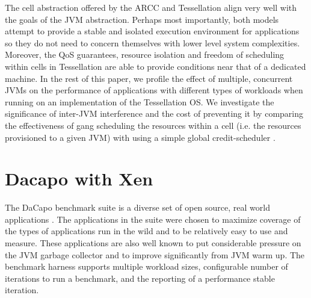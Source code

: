 \documentclass{sig-alternate}
\begin{document}
The cell abstraction offered by the ARCC and Tessellation align very well with the goals of the JVM abstraction. Perhaps most importantly, both models attempt to provide a stable and isolated execution environment for applications so they do not need to concern themselves with lower level system complexities. Moreover, the QoS guarantees, resource isolation and freedom of scheduling within cells in Tessellation are able to provide conditions near that of a dedicated machine. In the rest of this paper, we profile the effect of multiple, concurrent JVMs on the performance of applications with different types of workloads when running on an implementation of the Tessellation OS. We investigate the significance of inter-JVM interference and the cost of preventing it by comparing the effectiveness of gang scheduling the resources within a cell (i.e. the resources provisioned to a given JVM) with using a simple global credit-scheduler \cite{ackaouy2006xen}.

\section{Dacapo with Xen} \label{sec:dacapo}
The DaCapo benchmark suite is a diverse set of open source, real world applications \cite{blackburn2006dacapo}. The applications in the suite were chosen to maximize coverage of the types of applications run in the wild and to be relatively easy to use and measure. These applications are also well known to put considerable pressure on the JVM garbage collector and to improve significantly from JVM warm up. The benchmark harness supports multiple workload sizes, configurable number of iterations to run a benchmark, and the reporting of a performance stable iteration.
\end{document}
